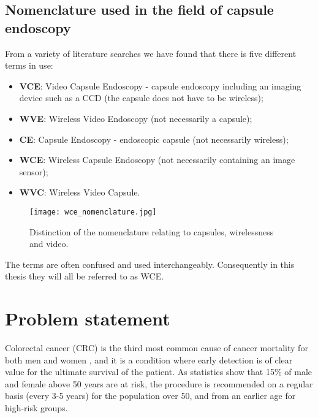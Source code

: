 \documentclass[thesis.tex]{subfiles}
\begin{document}


\subsection{Nomenclature used in the field of capsule endoscopy}
From a variety of literature searches we have found that there is five different terms in use:

\begin{itemize}
\item \textbf{VCE}: Video Capsule Endoscopy - capsule endoscopy including an imaging device such as a CCD (the capsule does not have to be wireless);
\item \textbf{WVE}: Wireless Video Endoscopy (not necessarily a capsule);
\item \textbf{CE}: Capsule Endoscopy - endoscopic capsule (not necessarily wireless);
\item \textbf{WCE}: Wireless Capsule Endoscopy (not necessarily containing an image sensor);
\item \textbf{WVC}: Wireless Video Capsule.
\end{itemize}

\begin{figure}[H] %
  \begin{center}
    \texttt{[image: wce\_nomenclature.jpg]}
    \caption[Distinction of the nomenclature relating to capsules, wirelessness and video.]{Distinction of the nomenclature relating to capsules, wirelessness and video.}
    \label{fig:wce_nomenclature}
  \end{center}
\end{figure}

The terms are often confused and used interchangeably. Consequently in this thesis they will all be referred to as WCE.



\section{Problem statement} \label{sec:problem_statment}
Colorectal cancer (CRC) is the third most common cause of cancer mortality for both men and women \cite{CancerStatistics10}, and it is a condition where early detection is of clear value for the ultimate survival of the patient. As statistics show that 15\% of male and female above 50 years are at risk, the procedure is recommended on a regular basis (every 3-5 years) for the population over 50, and from an earlier age for high-risk groups. 
\end{document}
